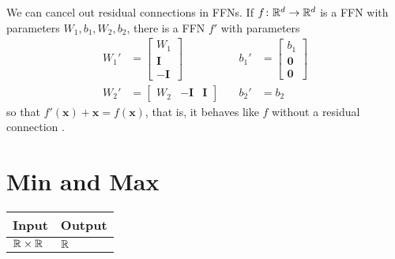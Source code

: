    We can cancel out residual connections in FFNs. If $f\colon\mathbb{R}^d\to \mathbb{R}^d$ is a FFN with parameters $W_1, b_1, W_2, b_2$, there is a FFN $f'$ with parameters
    \begin{align*}
        W_1'&=\begin{bmatrix}
            W_1\\
            \textbf{I}\\
            -\textbf{I}
        \end{bmatrix}  &\quad b_1'&=\begin{bmatrix}
            b_1\\
            \textbf{0}\\
            \textbf{0}
        \end{bmatrix}\\
        W_2'&=\begin{bmatrix}
            W_2& -\textbf{I} & \textbf{I}
        \end{bmatrix}
        & \quad b_2' &= b_2
    \end{align*}
    so that $f'(\mathbf{x}) + \mathbf{x} = f(\mathbf{x})$, that is, it behaves like $f$ without a residual connection \citep{chiang+:icml2023}.

\section{Min and Max}\label{sec:ffnn_minmax}
    \begin{tabular}{|p{1.5cm}|p{1.5cm}|}
        \hline
        \rowcolor{orange!20} %
        \textbf{Input} & \textbf{Output} \\
        \hline
        $\mathbb{R}\times\mathbb{R}$ & $\mathbb{R}$ \\
        \hline
    \end{tabular}


